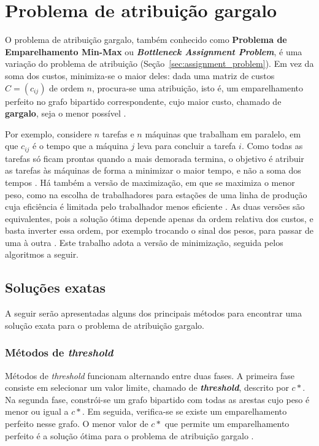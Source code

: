 \section{Problema de atribuição gargalo}

O problema de atribuição gargalo, também conhecido como \textbf{Problema de Emparelhamento Min-Max} ou \textbf{\textit{Bottleneck Assignment Problem}}, é uma variação do problema de atribuição (Seção~\ref{sec:assignment_problem}). Em vez da soma dos custos, minimiza-se o maior deles: dada uma matriz de custos $C = (c_{ij})$ de ordem $n$, procura-se uma atribuição, isto é, um emparelhamento perfeito no grafo bipartido correspondente, cujo maior custo, chamado de \textbf{gargalo}, seja o menor possível \cite{burkard}.

Por exemplo, considere $n$ tarefas e $n$ máquinas que trabalham em paralelo, em que $c_{ij}$ é o tempo que a máquina $j$ leva para concluir a tarefa $i$. Como todas as tarefas só ficam prontas quando a mais demorada termina, o objetivo é atribuir as tarefas às máquinas de forma a minimizar o maior tempo, e não a soma dos tempos \cite{burkard}. Há também a versão de maximização, em que se maximiza o menor peso, como na escolha de trabalhadores para estações de uma linha de produção cuja eficiência é limitada pelo trabalhador menos eficiente \cite{lawler}. As duas versões são equivalentes, pois a solução ótima depende apenas da ordem relativa dos custos, e basta inverter essa ordem, por exemplo trocando o sinal dos pesos, para passar de uma à outra \cite{burkard}. Este trabalho adota a versão de minimização, seguida pelos algoritmos a seguir.

\subsection{Soluções exatas}

A seguir serão apresentadas alguns dos principais métodos para encontrar uma solução exata para o problema de atribuição gargalo.

\subsubsection{Métodos de \textit{threshold}}

Métodos de \textit{threshold} funcionam alternando entre duas fases. A primeira fase consiste em selecionar um valor limite, chamado de \textbf{\textit{threshold}}, descrito por $c\ast$. Na segunda fase, constrói-se um grafo bipartido com todas as arestas cujo peso é menor ou igual a $c\ast$. Em seguida, verifica-se se existe um emparelhamento perfeito nesse grafo. O menor valor de $c\ast$ que permite um emparelhamento perfeito é a solução ótima para o problema de atribuição gargalo \cite{burkard}.

